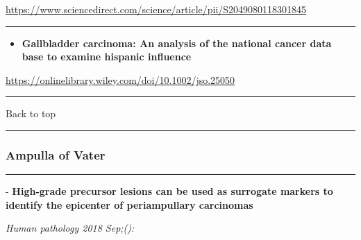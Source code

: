 \documentclass[]{article}
\providecommand{\tightlist}{%
  \setlength{\itemsep}{0pt}\setlength{\parskip}{0pt}}
\begin{document}
\url{https://www.sciencedirect.com/science/article/pii/S2049080118301845}

\begin{center}\rule{0.5\linewidth}{\linethickness}\end{center}

\begin{itemize}
\tightlist
\item
  \textbf{Gallbladder carcinoma: An analysis of the national cancer data
  base to examine hispanic influence}
\end{itemize}

\url{https://onlinelibrary.wiley.com/doi/10.1002/jso.25050}

\begin{center}\rule{0.5\linewidth}{\linethickness}\end{center}

Back to top

\begin{center}\rule{0.5\linewidth}{\linethickness}\end{center}

\pagebreak

\hypertarget{ampulla-of-vater}{%
\subsubsection{Ampulla of Vater}\label{ampulla-of-vater}}

\begin{center}\rule{0.5\linewidth}{\linethickness}\end{center}

 - \textbf{High-grade precursor lesions can be used as surrogate markers
to identify the epicenter of periampullary carcinomas}

\emph{Human pathology 2018 Sep;():}
\end{document}
